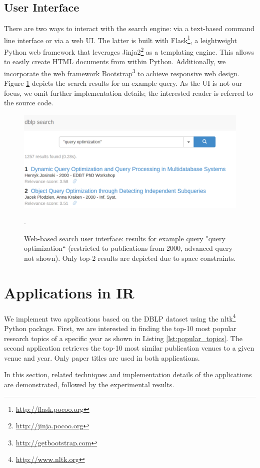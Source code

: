 \documentclass{sig-alternate-05-2015}
\begin{document}
\subsection{User Interface}

There are two ways to interact with the search engine: via a text-based command line interface or via a web UI. The latter is built with Flask\footnote{\url{http://flask.pocoo.org}}, a leightweight Python web framework that leverages Jinja2\footnote{\url{http://jinja.pocoo.org}} as a templating engine. This allows to easily create HTML documents from within Python. Additionally, we incorporate the web framework Bootstrap\footnote{\url{http://getbootstrap.com}} to achieve responsive web design. Figure \ref{fig:search} depicts the search results for an example query. As the UI is not our focus, we omit further implementation details; the interested reader is referred to the source code.

\begin{figure}[th]
\centering
\includegraphics[width=.8\textwidth]{img/search}
\caption{Web-based search user interface: results for example query "query optimization`` (restricted to publications from 2000, advanced query not shown). Only top-2 results are depicted due to space constraints.}. 
\label{fig:search}
\end{figure}

\section{Applications in IR} \label{sec:ir}
We implement two applications based on the DBLP dataset using the nltk\footnote{\url{http://www.nltk.org}} Python package. First, we are interested in finding the top-10 most popular research topics of a specific year as shown in Listing \ref{lst:popular_topics}. The second application retrieves the top-10 most similar publication venues to a given venue and year. Only paper titles are used in both applications.

In this section, related techniques and implementation details of the applications are demonstrated, followed by the experimental results.
\end{document}
